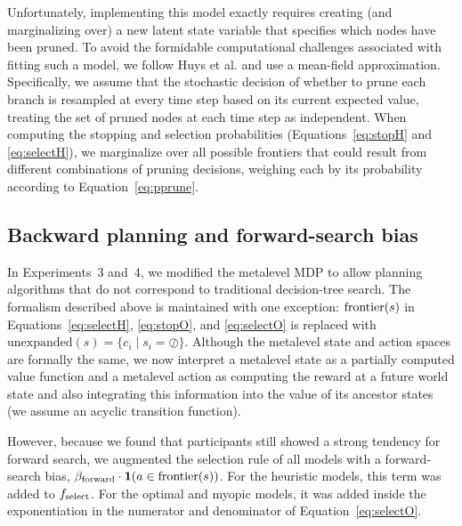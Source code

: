 Unfortunately, implementing this model exactly requires creating (and marginalizing over) a new latent state variable that specifies which nodes have been pruned. To avoid the formidable computational challenges associated with fitting such a model, we follow Huys et al. \citep{huys2012bonsai,huys2015interplay} and use a mean-field approximation. Specifically, we assume that the stochastic decision of whether to prune each branch is resampled at every time step based on its current expected value, treating the set of pruned nodes at each time step as independent. When computing the stopping and selection probabilities (Equations~\ref{eq:stopH} and \ref{eq:selectH}), we marginalize over all possible frontiers that could result from different combinations of pruning decisions, weighing each by its probability according to Equation~\ref{eq:pprune}.

\subsection{Backward planning and forward-search bias}\label{sec:planning-backward}
In Experiments~3 and~4, we modified the metalevel MDP to allow planning algorithms that do not correspond to traditional decision-tree search. The formalism described above is maintained with one exception: $\mathrm{frontier}(s)$ in Equations~\ref{eq:selectH}, \ref{eq:stopO}, and \ref{eq:selectO} is replaced with $\mathrm{unexpanded}(s) = \{c_i \mid s_i = \oslash \}$. Although the metalevel state and action spaces are formally the same, we now interpret a metalevel state as a partially computed value function and a metalevel action as computing the reward at a future world state and also integrating this information into the value of its ancestor states (we assume an acyclic transition function).

However, because we found that participants still showed a strong tendency for forward search, we augmented the selection rule of all models with a forward-search bias, $\beta_{\mathrm{forward}} \cdot \mathbf{1}(a \in \mathrm{frontier}(s))$. For the heuristic models, this term was added to $f_{\mathrm{select}}$. For the optimal and myopic models, it was added inside the exponentiation in the numerator and denominator of Equation~\ref{eq:selectO}.

